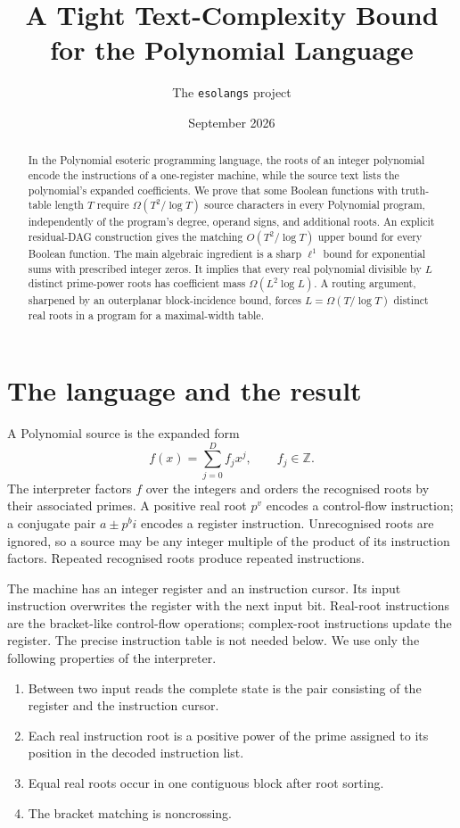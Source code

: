 \documentclass[11pt]{article}
\title{A Tight Text-Complexity Bound for the Polynomial Language}
\author{The \texttt{esolangs} project}
\date{September 2026}
\theoremstyle{definition}
\theoremstyle{remark}
\newcommand{\Z}{\mathbb Z}
\begin{document}
\maketitle

\begin{abstract}
In the Polynomial esoteric programming language, the roots of an
integer polynomial encode the instructions of a one-register machine, while
the source text lists the polynomial's expanded coefficients.  We prove that
some Boolean functions with truth-table length $T$ require
$\Omega(T^2/\log T)$ source characters in every Polynomial program,
independently of the program's degree, operand signs, and additional roots.
An explicit residual-DAG construction gives the matching
$O(T^2/\log T)$ upper bound for every Boolean function.  The main algebraic
ingredient is a sharp $\ell^1$ bound for exponential sums with prescribed
integer zeros.  It implies that every real polynomial divisible by $L$
distinct prime-power roots has coefficient mass
$\Omega(L^2\log L)$.  A routing argument, sharpened by an outerplanar
block-incidence bound, forces $L=\Omega(T/\log T)$ distinct real roots in a
program for a maximal-width table.
\end{abstract}

\section{The language and the result}

A Polynomial source is the expanded form
\[
  f(x)=\sum_{j=0}^{D} f_jx^j,\qquad f_j\in\Z.
\]
The interpreter factors $f$ over the integers and orders the recognised
roots by their associated primes.  A positive real root $p^v$ encodes a
control-flow instruction; a conjugate pair $a\pm p^b i$ encodes a register
instruction.  Unrecognised roots are ignored, so a source may be any integer
multiple of the product of its instruction factors.  Repeated recognised
roots produce repeated instructions.

The machine has an integer register and an instruction cursor.  Its input
instruction overwrites the register with the next input bit.  Real-root
instructions are the bracket-like control-flow operations; complex-root
instructions update the register.  The precise instruction table is not
needed below.  We use only the following properties of the interpreter.

\begin{enumerate}
\item Between two input reads the complete state is the pair consisting of
the register and the instruction cursor.
\item Each real instruction root is a positive power of the prime assigned to
its position in the decoded instruction list.
\item Equal real roots occur in one contiguous block after root sorting.
\item The bracket matching is noncrossing.
\end{enumerate}
\end{document}
